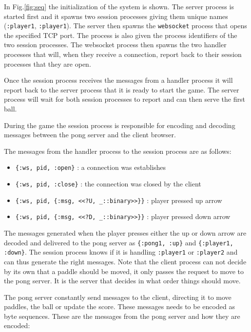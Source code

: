 \documentclass[a4paper,11pt]{article}
\begin{document}
In Fig.\ref{fig:seq} the initialization of the system is shown. The
server process is started first and it spawns two session processes
giving them unique names ({\tt :player1}, {\tt :player1}). The server
then spawns the {\tt websocket} process that opens the specified TCP
port. The process is also given the process identifiers of the two
session processes. The websocket process then spawns the two handler
processes that will, when they receive a connection, report back to
their session processes that they are open. 

Once the session process receives the messages from a handler process
it will report back to the server process that it is ready to start
the game. The server process will wait for both session processes to
report and can then serve the first ball. 

During the game the session process is responsible for encoding and
decoding messages between the pong server and the client browser.

The messages from the handler process to the session process are as follows:

\begin{itemize}
\item {\tt \{:ws, pid, :open\}}  : a connection was establishes
\item {\tt \{:ws, pid, :close\}} : the connection was closed by the client
\item {\tt \{:ws, pid, \{:msg,  <<?U, _::binary>>\}\}} : player pressed up arrow
\item {\tt \{:ws, pid, \{:msg,  <<?D, _::binary>>\}\}} : player pressed down arrow
\end{itemize}

The messages generated when the player presses either the up or down
arrow are decoded and delivered to the pong server as {\tt\{:pong1,
  :up\}} and {\tt\{:player1, :down\}}. The session process knows if it
is handling {\tt :player1} or {\tt :player2} and can thus generate the
right messages. Note that the client process can not decide by its own
that a paddle should be moved, it only passes the request to move to
the pong server. It is the server that decides in what order things
should move.

The pong server constantly send messages to the client, directing it to
move paddles, the ball or update the score. These messages needs to be
encoded as byte sequences. These are the messages from the pong server
and how they are encoded:
\end{document}
